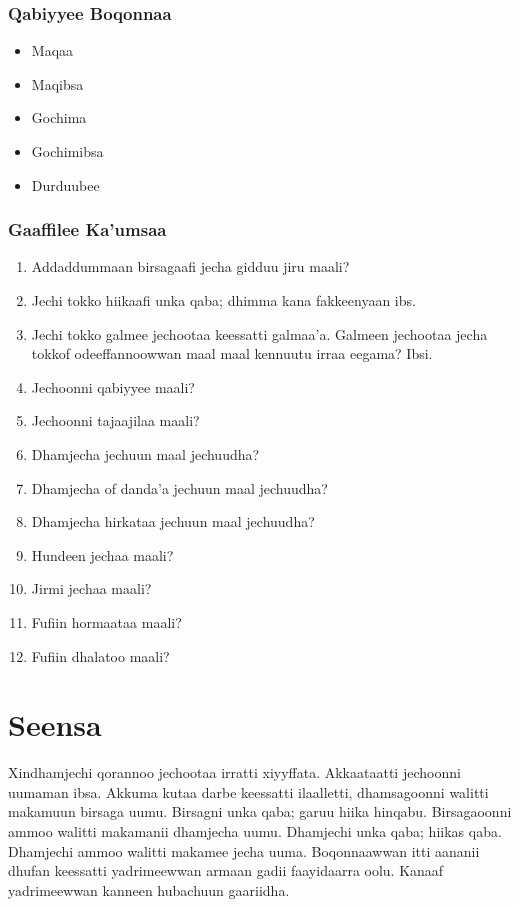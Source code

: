 \documentclass[11pt,b5paper]{book}
\begin{document}
\begin{itemize}
\subsubsection{Qabiyyee Boqonnaa}
\begin{itemize}
	\item Maqaa
	\item Maqibsa
	\item Gochima
	\item Gochimibsa
	\item Durduubee
	
	
\end{itemize}
\subsubsection{Gaaffilee Ka'umsaa}

\begin{enumerate}
  \item Addaddummaan birsagaafi jecha gidduu jiru maali?
  \item Jechi tokko hiikaafi unka qaba; dhimma kana fakkeenyaan ibs.
  \item Jechi tokko galmee jechootaa keessatti galmaa’a. Galmeen jechootaa jecha tokkof odeeffannoowwan maal maal kennuutu irraa eegama? Ibsi.
  \item Jechoonni qabiyyee maali?
  \item Jechoonni tajaajilaa maali?
  \item Dhamjecha jechuun maal jechuudha?
  \item Dhamjecha of danda’a jechuun maal jechuudha?
  \item Dhamjecha hirkataa jechuun maal jechuudha?
  \item Hundeen jechaa maali?
  \item Jirmi jechaa maali?
  \item Fufiin hormaataa maali?
  \item Fufiin dhalatoo maali?

\end{enumerate}
\section{Seensa}
Xindhamjechi qorannoo jechootaa irratti xiyyffata. Akkaataatti jechoonni uumaman ibsa. Akkuma kutaa darbe keessatti ilaalletti, dhamsagoonni walitti makamuun birsaga uumu. Birsagni unka qaba; garuu hiika hinqabu. Birsagaoonni ammoo walitti makamanii dhamjecha uumu. Dhamjechi unka qaba; hiikas qaba. Dhamjechi ammoo walitti makamee jecha uuma. Boqonnaawwan itti aananii dhufan keessatti yadrimeewwan armaan gadii faayidaarra oolu. Kanaaf yadrimeewwan kanneen hubachuun gaariidha. 


\end{itemize}
\end{document}
